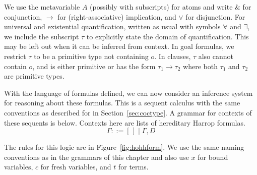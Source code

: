 We use the metavariable $A$ (possibly with subscripts) for atoms and write $\&$ for conjunction, $\longrightarrow$ for (right-associative) implication, and $\vee$ for disjunction. For universal and existential quantification, written as usual with symbols $\forall$ and $\exists$, we include the subscript $\tau$ to explicitly state the domain of quantification. This may be left out when it can be inferred from context. In goal formulas, we restrict $\tau$ to be a primitive type not containing $o$. In clauses, $\tau$ also cannot contain $o$, and is either primitive or has the form $\tau_1\rightarrow\tau_2$ where both $\tau_1$ and $\tau_2$ are primitive types.

With the language of formulas defined, we can now consider an inference system for reasoning about these formulas. This is a sequent calculus with the same conventions as described for \coc{} in Section~\ref{sec:coctype}. A grammar for contexts of these sequents is below. Contexts here are lists of hereditary Harrop formulas.
$$
\Gamma ::= [ \, ] \mathrel{|} \Gamma,D
$$

The rules for this logic are in Figure~\ref{fig:hohhform}. We use the same naming conventions as in the grammars of this chapter and also use $x$ for bound variables, $c$ for fresh variables, and $t$ for terms. %

